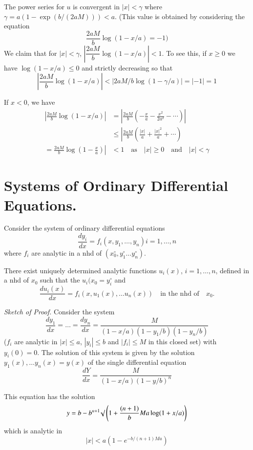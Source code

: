 \begin{remark*}
The power series for $u$ is convergent in $|x|<\gamma$ where $\gamma=a(1-\exp(b/(2aM)))<a$. (This value is obtained by considering the equation
$$
\frac{2aM}{b}\log (1-x/a)=-1)
$$
We claim that for $|x|<\gamma$, $\left|\dfrac{2aM}{b}\log (1-x/a)\right|<1$. To see this, if $x\geq 0$ we have $\log (1-x/a)\leq 0$ and strictly decreasing so that
$$
\left| \frac{2aM}{b}\log (1-x/a)\right|<|2aM/b\log (1-\gamma/a)|=|-1|=1
$$

If $x<0$, we have
\begin{align*}
\left| \frac{2aM}{b}\log (1-x/a)\right| &= \left|\frac{2aM}{b}\left(-\frac{x}{a}-\frac{x^{2}}{2a^{2}}-\cdots\right)\right|\\[3pt]
&\leq \left| \frac{2aM}{b}\left(\frac{|x|}{a}+\frac{|x|^{2}}{a}+\cdots\right)\right.\\[3pt]
\left.=\frac{2aM}{b}\log \left(1-\frac{x}{a}\right)\right| &< 1 \text{~~ as~~ } |x|\geq 0\quad\text{and}\quad |x|<\gamma
\end{align*}
\end{remark*}

\section*{Systems of Ordinary Differential Equations.}

Consider the system of ordinary differential equations
$$
\dfrac{dy_{i}}{dx}= f_{i}(x,y_{1},\ldots,y_{n})i=1,\ldots,n
$$
where $f_{i}$ are analytic in a nhd of $(x^{\circ}_{0},y^{\circ}_{1}\ldots y^{\circ}_{n})$.

\begin{theorem*}
There exist uniquely determined analytic functions $u_{i}(x)$, $i=1,\ldots,n$, defined in a nhd of $x_{0}$ such that the $u_{i}(x_{0}=y^{\circ}_{i}$ and
$$
\frac{du_{i}(x)}{dx}=f_{i}(x,u_{1}(x),\ldots u_{n}(x))\quad\text{in the nhd of}\quad x_{0}.
$$
\end{theorem*}

\noindent
{\em Sketch of Proof.} Consider the system
$$
\dfrac{dy_{1}}{dx}=\ldots=\frac{dy_{n}}{dx}=\frac{M}{(1-x/a)(1-y_{1}/b)(1-y_{n}/b)}
$$
($f_{i}$ are analytic in $|x|\leq a$, $|y_{i}|\leq b$ and $|f_{i}|\leq M$ in this closed set) with $y_{i}(0)=0$. The solution of this system is given by the solution $y_{1}(x),\ldots y_{n}(x)=y(x)$ of the single differential equation
$$
\frac{dY}{dx}=\frac{M}{(1-x/a)(1-y/b)^{n}}
$$\pageoriginale

This equation has the solution
$$
y=b-b^{n+1}\surd \left(1+\frac{(n+1)}{b}Ma\log (1+x/a)\right)
$$
which is analytic in
$$
|x|<a\left(1-e^{-b/(n+1)Ma}\right)
$$

